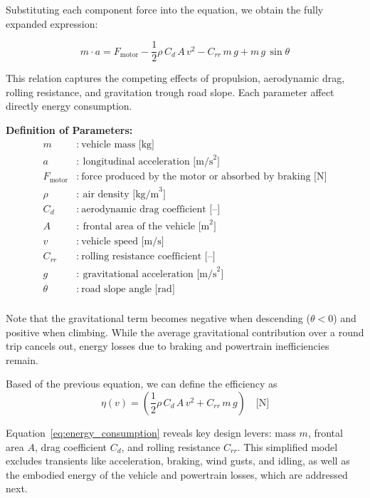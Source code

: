 Substituting each component force into the equation, we obtain the fully expanded expression:

\[
m \cdot a = F_{\text{motor}} - \frac{1}{2} \rho\, C_d\, A\, v^2 - C_{rr}\, m\, g + m\, g\, \sin\theta
\]

This relation captures the competing effects of propulsion, aerodynamic drag, rolling resistance, and gravitation trough road slope. Each parameter affect directly energy consumption.

\vspace{0.5em}
\noindent
\textbf{Definition of Parameters:}
\begin{align*}
m &:\ \text{vehicle mass [kg]} \\
a &:\ \text{longitudinal acceleration [m/s}^2\text{]} \\
F_{\text{motor}} &:\ \text{force produced by the motor or absorbed by braking [N]} \\
\rho &:\ \text{air density [kg/m}^3\text{]} \\
C_d &:\ \text{aerodynamic drag coefficient [–]} \\
A &:\ \text{frontal area of the vehicle [m}^2\text{]} \\
v &:\ \text{vehicle speed [m/s]} \\
C_{rr} &:\ \text{rolling resistance coefficient [–]} \\
g &:\ \text{gravitational acceleration [m/s}^2\text{]} \\
\theta &:\ \text{road slope angle [rad]} \\
\end{align*}

Note that the gravitational term becomes negative when descending (\(\theta < 0\)) and positive when climbing. While the average gravitational contribution over a round trip cancels out, energy losses due to braking and powertrain inefficiencies remain.

Based of the previous equation, we can define the efficiency as 
\begin{equation}
\eta(v) = \left( \frac{1}{2} \rho\, C_d\, A\, v^2 + C_{rr}\, m\, g \right) \quad \text{[N]}
\label{eq:energy_consumption}
\end{equation}

Equation~\eqref{eq:energy_consumption} reveals key design levers: mass \(m\), frontal area \(A\), drag coefficient \(C_d\), and rolling resistance \(C_{rr}\). This simplified model excludes transients like acceleration, braking, wind gusts, and idling, as well as the embodied energy of the vehicle and powertrain losses, which are addressed next.

